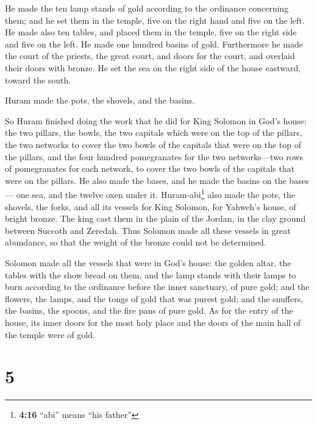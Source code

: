  He made the ten lamp stands of gold according to the
ordinance concerning them; and he set them in the temple, five on the
right hand and five on the left.  He made also ten tables,
and placed them in the temple, five on the right side and five on the
left. He made one hundred basins of gold.  Furthermore he
made the court of the priests, the great court, and doors for the court,
and overlaid their doors with bronze.  He set the sea on
the right side of the house eastward, toward the south.

 Huram made the pots, the shovels, and the basins.

So Huram finished doing the work that he did for King Solomon in God's
house:  the two pillars, the bowls, the two capitals
which were on the top of the pillars, the two networks to cover the two
bowls of the capitals that were on the top of the pillars,
 and the four hundred pomegranates for the two
networks---two rows of pomegranates for each network, to cover the two
bowls of the capitals that were on the pillars.  He also
made the bases, and he made the basins on the bases--- 
one sea, and the twelve oxen under it. 
Huram-abi\footnote{\textbf{4:16} ``abi'' means ``his father''} also made
the pots, the shovels, the forks, and all its vessels for King Solomon,
for Yahweh's house, of bright bronze.  The king cast them
in the plain of the Jordan, in the clay ground between Succoth and
Zeredah.  Thus Solomon made all these vessels in great
abundance, so that the weight of the bronze could not be determined.

 Solomon made all the vessels that were in God's house:
the golden altar, the tables with the show bread on them,
 and the lamp stands with their lamps to burn according
to the ordinance before the inner sanctuary, of pure gold;
 and the flowers, the lamps, and the tongs of gold that
was purest gold;  and the snuffers, the basins, the
spoons, and the fire pans of pure gold. As for the entry of the house,
its inner doors for the most holy place and the doors of the main hall
of the temple were of gold.

\hypertarget{section-4}{%
\section{5}\label{section-4}}

